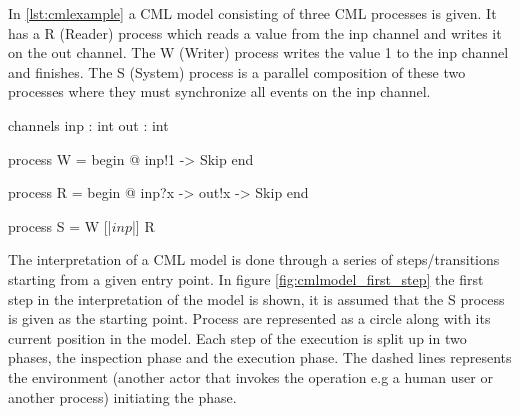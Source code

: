 \documentclass[a4paper, 10pt]{include/compassreport}   %
\begin{document}
In \autoref{lst:cmlexample} a CML model consisting of three CML
processes is given. It has a R (Reader) process which reads a value from
the inp channel and writes it on the out channel. The W (Writer)
process writes the value 1 to the inp channel and finishes. The
S (System) process is a parallel composition of these two processes where
they must synchronize all events on the inp channel.

\begin{cml}[caption=A process S composed of a parallel composition of a reader and writer process,tabsize=2, label={lst:cmlexample}]
channels
inp : int
out : int

process W =
begin
 @ inp!1 -> Skip
end

process R =
begin
 @ inp?x -> out!x -> Skip
end

process S = W [|{$inp$}|] R
\end{cml}

The interpretation of a CML model is done through a series of
steps/transitions starting from a given entry point. In figure
\ref{fig:cmlmodel_first_step} the first step in the interpretation of
the model is shown, it is assumed that the S process is given as the
starting point. Process are represented as a circle along with its
current position in the model. Each step of the execution is split up
in two phases, the inspection phase and the execution phase. The
dashed lines represents the environment (another actor that invokes
the operation e.g a human user or another process) initiating the phase.

 \begin{minipage}{1\linewidth}
  \centering %
\label{fig:cmlmodel_first_step}
 \end{minipage}
\end{document}
